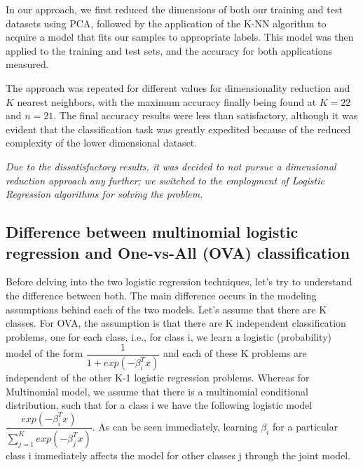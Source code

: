 \documentclass[journal]{IEEEtran}
\begin{document}
In our approach, we first reduced the dimensions of both our training and test datasets using PCA, followed by the application of the K-NN algorithm to acquire a model that fits our samples to appropriate labels. This model was then applied to the training and test sets, and the accuracy for both applications measured. \par

The approach was repeated for different values for dimensionality reduction and $K$ nearest neighbors, with the maximum accuracy finally being found at $K = 22$ and $n = 21$. The final accuracy results were less than satisfactory, although it was evident that the classification task was greatly expedited because of the reduced complexity of the lower dimensional dataset. \par

\textit{Due to the dissatisfactory results, it was decided to not pursue a dimensional reduction approach any further; we switched to the employment of Logistic Regression algorithms for solving the problem.} \par

\subsection{Difference between multinomial logistic regression and One-vs-All (OVA) classification}
Before delving into the two logistic regression techniques, let's try to understand the difference between both. The main difference occurs in the modeling assumptions behind each of the two models. Let's assume that there are K classes. For OVA, the assumption is that there are K independent classification problems, one for each class, i.e., for class i, we learn a logistic (probability) model of the form $\dfrac{1}{1+exp(-\beta_{i}^Tx)}$ and each of these K problems are independent of the other K-1 logistic regression problems. Whereas for Multinomial model, we assume that there is a multinomial conditional distribution,  such that for a class i we have the following logistic model $\dfrac{exp(-\beta_{i}^Tx)}{\sum_{j=1}^{K}exp(-\beta_{j}^Tx)}$. As can be seen immediately, learning $\beta_i$ for a particular class i immediately affects the model for other classes j through the joint model.\\
\end{document}
